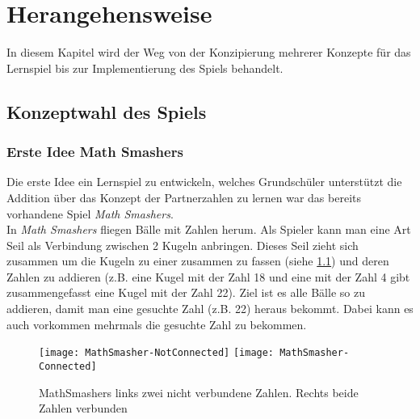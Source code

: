 %
\chapter{Herangehensweise}
In diesem Kapitel wird der Weg von der Konzipierung mehrerer Konzepte für das Lernspiel bis zur Implementierung des Spiels behandelt.
\section{Konzeptwahl des Spiels}
\subsection{Erste Idee Math Smashers}
Die erste Idee ein Lernspiel zu entwickeln, welches Grundschüler unterstützt die Addition über das Konzept der Partnerzahlen zu lernen war das bereits vorhandene Spiel \textit{Math Smashers}.\\
In \textit{Math Smashers} fliegen Bälle mit Zahlen herum. Als Spieler kann man eine Art Seil als Verbindung zwischen 2 Kugeln anbringen. Dieses Seil zieht sich zusammen um die Kugeln zu einer zusammen zu fassen (siehe \ref{fig:mathsmashers}) und deren Zahlen zu addieren (z.B. eine Kugel mit der Zahl 18 und eine mit der Zahl 4 gibt zusammengefasst eine Kugel mit der Zahl 22). Ziel ist es alle Bälle so zu addieren, damit man eine gesuchte Zahl (z.B. 22) heraus bekommt. Dabei kann es auch vorkommen mehrmals die gesuchte Zahl zu bekommen.
\begin{figure}[htb]
	\centering
	\texttt{[image: MathSmasher-NotConnected]}
	\texttt{[image: MathSmasher-Connected]}
	\caption{MathSmashers links zwei nicht verbundene Zahlen. Rechts beide Zahlen verbunden\label{fig:mathsmashers}}
\end{figure}
